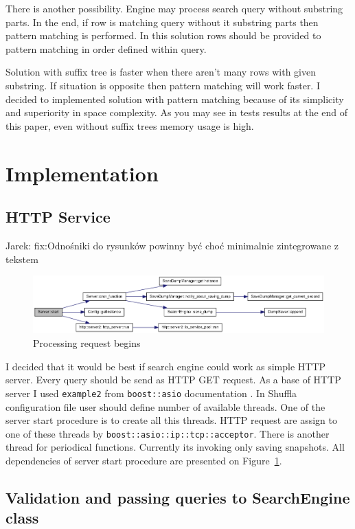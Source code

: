 \documentclass[10pt,a4paper]{article}
\newcommand{\jarek}[1]{\noindent\colorbox{myYellow}{Jarek: #1}}
\begin{document}
There is another possibility. Engine may process search query without substring parts. In the end, if row is matching query without it substring parts then pattern matching is performed. In this solution rows should be provided to pattern matching in order defined within query.

Solution with suffix tree is faster when there aren't many rows with given substring. If situation is opposite then pattern matching will work faster. I decided to implemented solution with pattern matching because of its simplicity and superiority in space complexity. As you may see in tests results at the end of this paper, even without suffix trees memory usage is high. 

\section{Implementation}

\subsection{HTTP Service}

\jarek{fix:Odnośniki do rysunków powinny być choć minimalnie zintegrowane z tekstem}

\begin{figure}
\centering
  \includegraphics[width=16cm]{start}
  \caption{Processing request begins}
  \label{fig:httpservice}
\end{figure}

I decided that it would be best if search engine could work as simple HTTP server. Every query should be send as HTTP GET request. As a base of HTTP server I used \verb|example2| from \verb|boost::asio| documentation \cite{ASIOHTTP}. In Shuffla configuration file user should define number of available threads. One of the server start procedure is to create all this threads. HTTP request are assign to one of these threads by \verb|boost::asio::ip::tcp::acceptor|. There is another thread for periodical functions. Currently its invoking only saving snapshots. All dependencies of server start procedure are presented on Figure~\ref{fig:httpservice}.

\subsection{Validation and passing queries to SearchEngine class}
\end{document}
